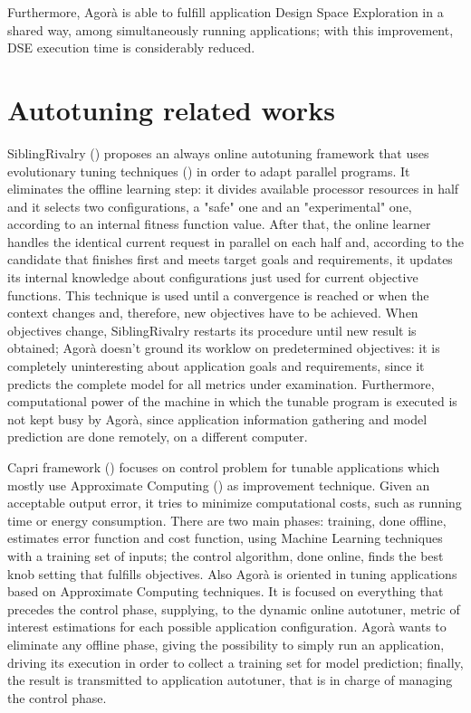 Furthermore, Agorà is able to fulfill application Design Space Exploration in a shared way, among simultaneously running applications; with this improvement, DSE execution time is considerably reduced. 

\section{Autotuning related works}

SiblingRivalry (\cite{ansel2012siblingrivalry}) proposes an always online autotuning framework that uses evolutionary tuning techniques (\cite{coello2007evolutionary}) in order to adapt parallel programs. It eliminates the offline learning step: it divides available processor resources in half and it selects two configurations, a "safe" one and an "experimental" one, according to an internal fitness function value. After that, the online learner handles the identical current request in parallel on each half and, according to the candidate that finishes first and meets target goals and requirements, it updates its internal knowledge about configurations just used for current objective functions. This technique is used until a convergence is reached or when the context changes and, therefore, new objectives have to be achieved. When objectives change, SiblingRivalry restarts its procedure until new result is obtained; Agorà doesn't ground its worklow on predetermined objectives: it is completely uninteresting about application goals and requirements, since it predicts the complete model for all metrics under examination. Furthermore, computational power of the machine in which the tunable program is executed is not kept busy by Agorà, since application information gathering and model prediction are done remotely, on a different computer.

Capri framework (\cite{sui2016proactive}) focuses on control problem for tunable applications which mostly use Approximate Computing (\cite{mittal2016survey}) as improvement technique. Given an acceptable output error, it tries to minimize computational costs, such as running time or energy consumption. There are two main phases: training, done offline, estimates error function and cost function, using Machine Learning techniques with a training set of inputs; the control algorithm, done online, finds the best knob setting that fulfills objectives. Also Agorà is oriented in tuning applications based on Approximate Computing techniques. It is focused on everything that precedes the control phase, supplying, to the dynamic online autotuner, metric of interest estimations for each possible application configuration. Agorà wants to eliminate any offline phase, giving the possibility to simply run an application, driving its execution in order to collect a training set for model prediction; finally, the result is transmitted to application autotuner, that is in charge of managing the control phase.

